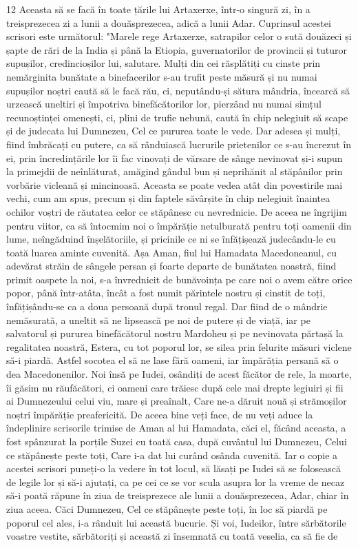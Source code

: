 \par 12 Aceasta să se facă în toate țările lui Artaxerxe, într-o singură zi, în a treisprezecea zi a lunii a douăsprezecea, adică a lunii Adar. Cuprinsul acestei scrisori este următorul: "Marele rege Artaxerxe, satrapilor celor o sută douăzeci și șapte de rări de la India și până la Etiopia, guvernatorilor de provincii și tuturor supușilor, credincioșilor lui, salutare. Mulți din cei răsplătiți cu cinste prin nemărginita bunătate a binefacerilor s-au trufit peste măsură și nu numai supușilor noștri caută să le facă rău, ci, neputându-și sătura mândria, încearcă să urzească uneltiri și împotriva binefăcătorilor lor, pierzând nu numai simțul recunoștinței omenești, ci, plini de trufie nebună, caută în chip nelegiuit să scape și de judecata lui Dumnezeu, Cel ce pururea toate le vede. Dar adesea și mulți, fiind îmbrăcați cu putere, ca să rânduiască lucrurile prietenilor ce s-au încrezut în ei, prin încredințările lor îi fac vinovați de vărsare de sânge nevinovat și-i supun la primejdii de neînlăturat, amăgind gândul bun și neprihănit al stăpânilor prin vorbărie vicleană și mincinoasă. Aceasta se poate vedea atât din povestirile mai vechi, cum am spus, precum și din faptele săvârșite în chip nelegiuit înaintea ochilor voștri de răutatea celor ce stăpânesc cu nevrednicie. De aceea ne îngrijim pentru viitor, ca să întocmim noi o împărăție netulburată pentru toți oamenii din lume, neîngăduind înșelătoriile, și pricinile ce ni se înfățișează judecându-le cu toată luarea aminte cuvenită. Așa Aman, fiul lui Hamadata Macedoneanul, cu adevărat străin de sângele persan și foarte departe de bunătatea noastră, fiind primit oaspete la noi, s-a învrednicit de bunăvoința pe care noi o avem către orice popor, până într-atâta, încât a fost numit părintele nostru și cinstit de toți, înfățișându-se ca a doua persoană după tronul regal. Dar fiind de o mândrie nemăsurată, a uneltit să ne lipsească pe noi de putere și de viață, iar pe salvatorul și pururea binefăcătorul nostru Mardoheu și pe nevinovata părtașă la regalitatea noastră, Estera, cu tot poporul lor, se silea prin felurite măsuri viclene să-i piardă. Astfel socotea el să ne lase fără oameni, iar împărăția persană să o dea Macedonenilor. Noi însă pe Iudei, osândiți de acest făcător de rele, la moarte, îi găsim nu răufăcători, ci oameni care trăiesc după cele mai drepte legiuiri și fii ai Dumnezeului celui viu, mare și preaînalt, Care ne-a dăruit nouă și strămoșilor noștri împărăție preafericită. De aceea bine veți face, de nu veți aduce la îndeplinire scrisorile trimise de Aman al lui Hamadata, căci el, făcând aceasta, a fost spânzurat la porțile Suzei cu toată casa, după cuvântul lui Dumnezeu, Celui ce stăpânește peste toți, Care i-a dat lui curând osânda cuvenită. Iar o copie a acestei scrisori puneți-o la vedere în tot locul, să lăsați pe Iudei să se folosească de legile lor și să-i ajutați, ca pe cei ce se vor scula asupra lor la vreme de necaz să-i poată răpune în ziua de treisprezece ale lunii a douăsprezecea, Adar, chiar în ziua aceea. Căci Dumnezeu, Cel ce stăpânește peste toți, în loc să piardă pe poporul cel ales, i-a rânduit lui această bucurie. Și voi, Iudeilor, între sărbătorile voastre vestite, sărbătoriți și această zi însemnată cu toată veselia, ca să fie de 